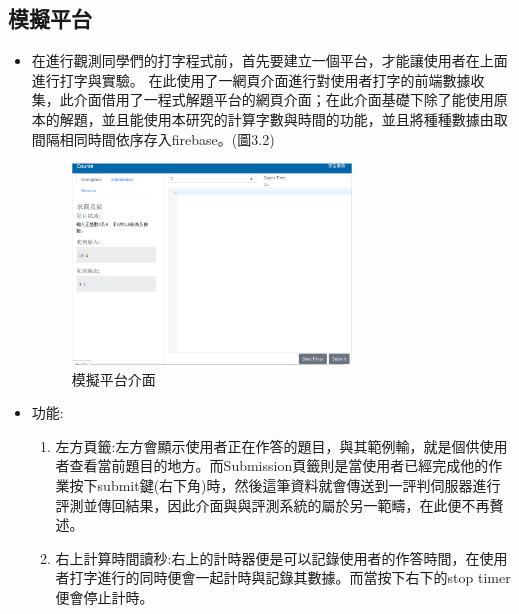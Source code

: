 \subsection{模擬平台}
\begin{itemize}
	\item 在進行觀測同學們的打字程式前，首先要建立一個平台，才能讓使用者在上面進行打字與實驗。
	在此使用了一網頁介面進行對使用者打字的前端數據收集，此介面借用了一程式解題平台的網頁介面；在此介面基礎下除了能使用原本的解題，並且能使用本研究的計算字數與時間的功能，並且將種種數據由取間隔相同時間依序存入firebase。(圖3.2)
	\begin{figure}[H]
		\centering
		\includegraphics[width=0.7\textwidth]{web_part.png}
		\caption{模擬平台介面}
		\label{Fig.3.2}
	\end{figure}
	\item 功能:\\
	\begin{enumerate}[1.]
		\item 左方頁籤:左方會顯示使用者正在作答的題目，與其範例輸，就是個供使用者查看當前題目的地方。而Submission頁籤則是當使用者已經完成他的作業按下submit鍵(右下角)時，然後這筆資料就會傳送到一評判伺服器進行評測並傳回結果，因此介面與與評測系統的屬於另一範疇，在此便不再贅述。
		\item 右上計算時間讀秒:右上的計時器便是可以記錄使用者的作答時間，在使用者打字進行的同時便會一起計時與記錄其數據。而當按下右下的stop timer便會停止計時。
	\end{enumerate}
\end{itemize}

